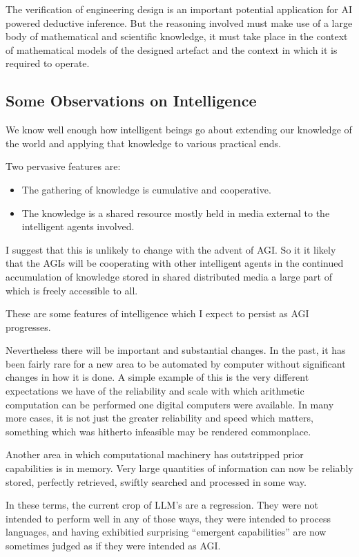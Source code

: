 \documentclass[10pt,titlepage]{book}
\begin{document}
The verification of engineering design is an important potential application for AI powered deductive inference.
But the reasoning involved must make use of a large body of mathematical and scientific knowledge, it must take place in the context of 
mathematical models of the designed artefact and the context in which it is required to operate.


\subsection{Some Observations on Intelligence}

We know well enough how intelligent beings go about extending our knowledge of the world and applying that knowledge to various practical ends.

Two pervasive features are:
\begin{itemize}
\item The gathering of knowledge is cumulative and cooperative.
\item The knowledge is a shared resource mostly held in media external to the intelligent agents involved.
\end{itemize}

I suggest that this is unlikely to change with the advent of AGI.
So it it likely that the AGIs will be cooperating with other intelligent agents in the continued accumulation of knowledge stored in shared distributed media a large part of which is freely accessible to all.

These are some features of intelligence which I expect to persist as AGI progresses.

Nevertheless there will be important and substantial changes.
In the past, it has been fairly rare for a new area to be automated by computer without significant changes in how it is done.
A simple example of this is the very different expectations we have of the reliability and scale with which arithmetic computation can be performed one digital computers were available.
In many more cases, it is not just the greater reliability and speed which matters, something which was hitherto infeasible may be rendered commonplace.

Another area in which computational machinery has outstripped prior capabilities is in memory.
Very large quantities of information can now be reliably stored, perfectly retrieved, swiftly searched and processed in some way.

In these terms, the current crop of LLM's are a regression.
They were not intended to perform well in any of those ways, they were intended to process languages, and having exhibitied surprising ``emergent capabilities'' are now sometimes judged as if they were intended as AGI.
\end{document}
